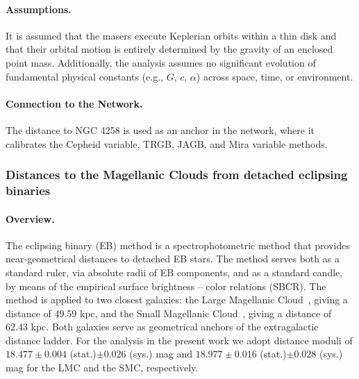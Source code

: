 \paragraph{Assumptions.}
It is assumed that the masers execute Keplerian orbits within a thin disk and that their orbital motion is entirely determined by the gravity of an enclosed point mass. Additionally, the analysis assumes no significant evolution of fundamental physical constants (e.g., $G$, $c$, $\alpha$) across space, time, or environment.

\paragraph{Connection to the Network.}
The distance to NGC 4258 is used as an anchor in the network, where it calibrates the Cepheid variable, TRGB, JAGB, and Mira variable methods.


\subsubsection{Distances to the Magellanic Clouds from detached eclipsing binaries}
\label{sec:MagClDEB}

\paragraph{Overview.}
The eclipsing binary (EB) method is a spectrophotometric method that provides near-geometrical distances to detached EB stars. The method serves both as a standard ruler, via absolute radii of EB components, and as a standard candle, by means of the empirical surface brightness -- color relations (SBCR). The method is applied to two closest galaxies: 
the Large Magellanic Cloud~\citep{2019Natur.567..200P}, giving a distance of 49.59 kpc, and the Small Magellanic Cloud~\citep{2020ApJ...904...13G}, giving a distance of 62.43 kpc. Both galaxies serve as geometrical anchors of the extragalactic distance ladder. For the analysis in the present work we adopt distance moduli of $18.477\pm 0.004$ (stat.)$ \pm 0.026$ (sys.) mag and $18.977 \pm 0.016 $ (stat.)$ \pm 0.028$ (sys.) mag for the LMC and the SMC, respectively.

